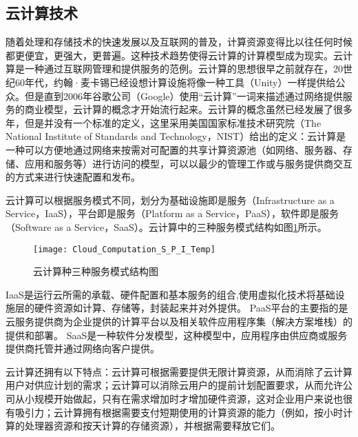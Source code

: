 \subsection{云计算技术}
随着处理和存储技术的快速发展以及互联网的普及，计算资源变得比以往任何时候都更便宜，更强大，更普遍。这种技术趋势使得云计算的计算模型成为现实。云计算是一种通过互联网管理和提供服务的范例\cite{zhang2010cloud,josep2010view}。云计算的思想很早之前就存在，20世纪60年代，约翰·麦卡锡已经设想计算设施将像一种工具（Unity）一样提供给公众\cite{parkhill1966challenge}。但是直到2006年谷歌公司（Google）使用“云计算”一词来描述通过网络提供服务的商业模型，云计算的概念才开始流行起来。云计算的概念虽然已经发展了很多年，但是并没有一个标准的定义\cite{sonnek2009virtual}，这里采用美国国家标准技术研究院（The National Institute of Standards and Technology，NIST）给出的定义\cite{zhang2010cloud}：云计算是一种可以方便地通过网络来按需对可配置的共享计算资源池（如网络、服务器、存储、应用和服务等）进行访问的模型，可以以最少的管理工作或与服务提供商交互的方式来进行快速配置和发布。

云计算可以根据服务模式不同，划分为基础设施即是服务（Infrastructure as a Service，IaaS），平台即是服务（Platform as a Service，PaaS），软件即是服务（Software as a Service，SaaS）\cite{林伟伟2012云计算资源调度研究综述,roman2018mobile}。云计算中的三种服务模式结构如图\ref{fig:cloud_computation_S_P_I}所示\cite{刘英男2011基于云计算框架的终端管理系统设计与实现}。

\begin{figure}[!htbp]
    \centering
    \texttt{[image: Cloud\_Computation\_S\_P\_I\_Temp]}
    \caption{云计算种三种服务模式结构图}
    \label{fig:cloud_computation_S_P_I}
\end{figure}

IaaS是运行云所需的承载、硬件配置和基本服务的组合,使用虚拟化技术将基础设施层的硬件资源如计算、存储等，封装起来并对外提供。
PaaS平台的主要指的是云服务提供商为企业提供的计算平台以及相关软件应用程序集（解决方案堆栈）的提供和部署。
SaaS是一种软件分发模型，这种模型中，应用程序由供应商或服务提供商托管并通过网络向客户提供\cite{manvi2014resource}。

云计算还拥有以下特点：云计算可根据需要提供无限计算资源，从而消除了云计算用户对供应计划的需求；云计算可以消除云用户的提前计划配置要求，从而允许公司从小规模开始做起，只有在需求增加时才增加硬件资源，这对企业用户来说也很有吸引力；云计算拥有根据需要支付短期使用的计算资源的能力（例如，按小时计算的处理器资源和按天计算的存储资源），并根据需要释放它们\cite{fox2009above}。

